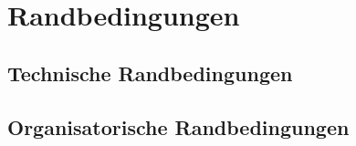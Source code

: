 \chapter{Randbedingungen}\label{ch:randbedingungen}


\section{Technische Randbedingungen}\label{sec:technische-randbedingungen}

\section{Organisatorische Randbedingungen}\label{sec:organisatorische-randbedingungen}

